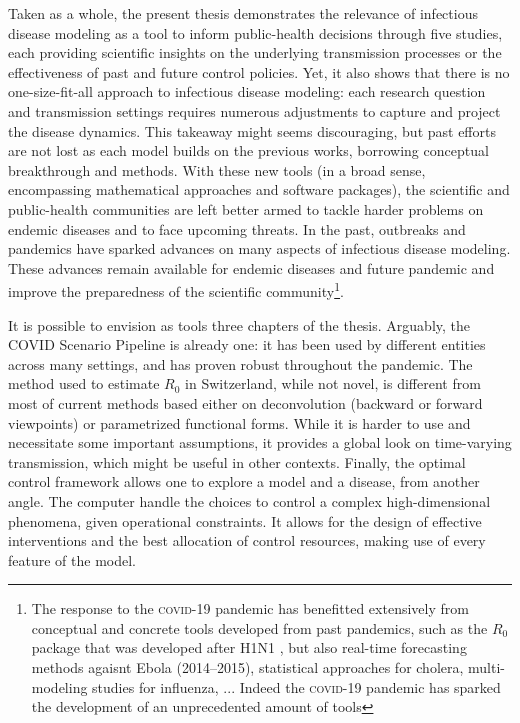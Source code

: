 Taken as a whole, the present thesis demonstrates the relevance of infectious disease modeling as a tool to inform public-health decisions through five studies, each providing scientific insights on the underlying transmission processes or the effectiveness of past and future control policies. Yet, it also shows that there is no one-size-fit-all approach to infectious disease modeling: each research question and transmission settings requires numerous adjustments to capture and project the disease dynamics. %
This takeaway might seems discouraging, but past efforts are not lost as each model builds on the previous works, borrowing conceptual breakthrough and methods. With these new tools (in a broad sense, encompassing  mathematical approaches and software packages), the scientific and public-health communities are left better armed to tackle harder problems on endemic diseases and to face upcoming threats. In the past, outbreaks and pandemics have sparked advances on many aspects of infectious disease modeling. These advances remain available for endemic diseases and future pandemic and improve the preparedness of the scientific community\footnote{The response to the \textsc{covid}-19 pandemic has benefitted extensively from conceptual and concrete tools developed from past pandemics, such as the $R_0$ package that was developed after H1N1 \parencite{Obadia:R0PackageToolbox:2012}, but also \eg real-time forecasting methods agaisnt Ebola (2014--2015), statistical approaches for cholera, multi-modeling studies for influenza, ... Indeed the \textsc{covid}-19 pandemic has sparked the development of an unprecedented amount of tools}. 

It is possible to envision as tools three chapters of the thesis.  Arguably, the COVID Scenario Pipeline is already one: it has been used by different entities across many settings, and has proven robust throughout the pandemic. The method used to estimate $R_0$ in Switzerland, while not novel, is different from most of current methods based either on deconvolution (backward or forward viewpoints) or parametrized functional forms. While it is harder to use and necessitate some important assumptions, it provides a global look on time-varying transmission, which might be useful in other contexts.%
Finally, the optimal control framework allows one to explore a model and a disease, from another angle. The computer handle the choices to control a complex high-dimensional phenomena, given operational constraints. It allows for the design of effective interventions and the best allocation of control resources, making use of every feature of the model. 

